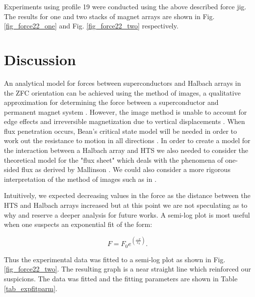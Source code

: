 Experiments using profile 19 were conducted using the above described force jig.  The results for one and two stacks of magnet arrays are shown in Fig. \ref{fig_force22_one} and Fig. \ref{fig_force22_two} respectively.

\section{Discussion}
An analytical model for forces between superconductors and Halbach arrays in the ZFC orientation can be achieved using the method of images, a qualitative approximation for determining the force between a superconductor and permanent magnet system \cite{perez, yang, kordyuk, saslow, Hull1999, tsuch2}. However, the image method is unable to account for edge effects and irreversible magnetization due to vertical displacements \cite{Hull1999}.  When flux penetration occurs, Bean's critical state model will be needed in order to work out the resistance to motion in all directions \cite{ma, tsuch2, ruiz, bean2, davis, del1}.  In order to create a model for the interaction between a Halbach array and HTS we also needed to consider the theoretical model for the "flux sheet" which deals with the phenomena of one-sided flux as derived by Mallinson \cite{mallinson}.  We could also consider a more rigorous interpretation of the method of images such as in \cite{perez}. 

Intuitively, we expected decreasing values in the force as the distance between the HTS and Halbach arrays increased but at this point we are not speculating as to why and reserve a deeper analysis for future works.  A semi-log plot is most useful when one suspects an exponential fit of the form:

\begin{equation}
F=F_0 e^{(\frac{-x}{x_0})}.
\end{equation}

Thus the experimental data was fitted to a semi-log plot as shown in Fig. \ref{fig_force22_two}.  The resulting graph is a near straight line which reinforced our suspicions.   The data was fitted and the fitting parameters are shown in Table \ref{tab_expfitparm}.

